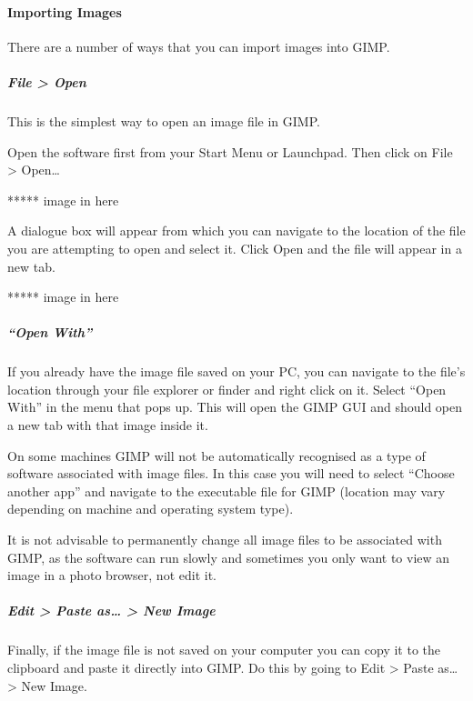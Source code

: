 \documentclass[]{book}
\let\oldparagraph\paragraph
\renewcommand{\paragraph}[1]{\oldparagraph{#1}\mbox{}}
\let\oldsubparagraph\subparagraph
\renewcommand{\subparagraph}[1]{\oldsubparagraph{#1}\mbox{}}
\begin{document}
\hypertarget{importing-images}{%
\paragraph{Importing Images}\label{importing-images}}

There are a number of ways that you can import images into GIMP.

\hypertarget{file-open}{%
\subparagraph{File \textgreater{} Open}\label{file-open}}

This is the simplest way to open an image file in GIMP.

Open the software first from your Start Menu or Launchpad. Then click on File \textgreater{} Open\ldots{}

***** image in here

A dialogue box will appear from which you can navigate to the location of the file you are attempting to open and select it. Click Open and the file will appear in a new tab.

***** image in here

\hypertarget{open-with}{%
\subparagraph{``Open With''}\label{open-with}}

If you already have the image file saved on your PC, you can navigate to the file's location through your file explorer or finder and right click on it. Select ``Open With'' in the menu that pops up. This will open the GIMP GUI and should open a new tab with that image inside it.

On some machines GIMP will not be automatically recognised as a type of software associated with image files. In this case you will need to select ``Choose another app'' and navigate to the executable file for GIMP (location may vary depending on machine and operating system type).

It is not advisable to permanently change all image files to be associated with GIMP, as the software can run slowly and sometimes you only want to view an image in a photo browser, not edit it.

\hypertarget{edit-paste-as-new-image}{%
\subparagraph{Edit \textgreater{} Paste as\ldots{} \textgreater{} New Image}\label{edit-paste-as-new-image}}

Finally, if the image file is not saved on your computer you can copy it to the clipboard and paste it directly into GIMP. Do this by going to Edit \textgreater{} Paste as\ldots{} \textgreater{} New Image.
\end{document}
